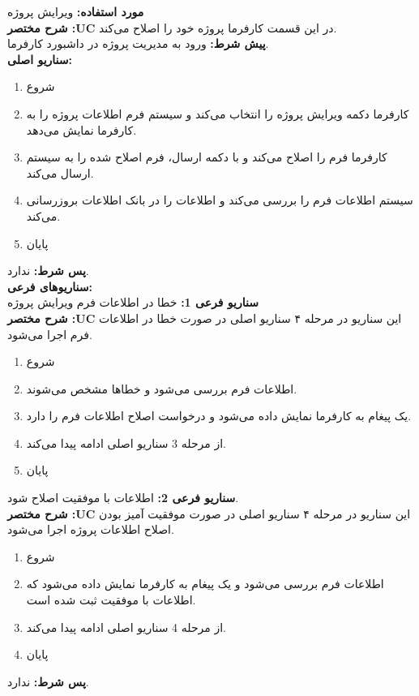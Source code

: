 \textbf{مورد استفاده:}
ویرایش پروژه
\\
\textbf{شرح مختصر :UC}
در این قسمت کارفرما پروژه خود را اصلاح می‌کند.
\\
\textbf{پيش شرط:}
ورود به مدیریت پروژه در داشبورد کارفرما.
\\
\textbf{سناريو اصلی:}
\begin{enumerate}
\item
شروع
\item
کارفرما دکمه ویرایش پروژه را انتخاب می‌کند و سیستم فرم اطلاعات پروژه را به کارفرما نمایش می‌دهد.
\item
کارفرما فرم را اصلاح می‌کند و با دکمه ارسال، فرم اصلاح شده را به سیستم ارسال می‌کند.
\item
سیستم اطلاعات فرم را بررسی می‌کند و اطلاعات را در بانک اطلاعات بروزرسانی می‌کند.
\item
پایان
\end{enumerate}

\noindent
\textbf{پس شرط:}
ندارد.
\\
\textbf{سناريوهای فرعی:}
\\
\textbf{سناريو فرعی 1:}
خطا در اطلاعات فرم ویرایش پروژه
\\
\textbf{شرح مختصر :UC}
این سناریو در مرحله ۴ سناریو اصلی در صورت خطا در اطلاعات فرم اجرا می‌شود.
\begin{enumerate}
\item
شروع
\item
اطلاعات فرم بررسی می‌شود و خطاها مشخص می‌شوند.
\item
یک پیغام به کارفرما نمایش داده می‌شود و درخواست اصلاح اطلاعات فرم را دارد.
\item
از مرحله 3 سناریو اصلی ادامه پیدا می‌کند.
\item
پایان
\end{enumerate}

\noindent
\textbf{سناريو فرعی 2:}
اطلاعات با موفقیت اصلاح شود.
\\
\textbf{شرح مختصر :UC}
این سناریو در مرحله ۴ سناریو اصلی در صورت موفقیت آمیز بودن اصلاح اطلاعات پروژه اجرا می‌شود.
\begin{enumerate}
\item
شروع
\item
اطلاعات فرم بررسی می‌شود و یک پیغام به کارفرما نمایش داده می‌شود که اطلاعات با موفقیت ثبت شده است.
\item
از مرحله 4 سناریو اصلی ادامه پیدا می‌کند.
\item
پایان
\end{enumerate}

\noindent
\textbf{پس شرط:}
ندارد.



